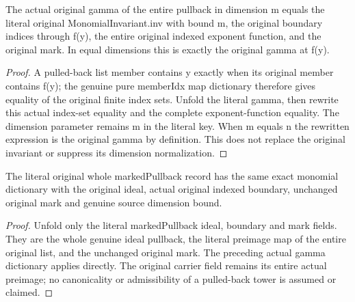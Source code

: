\begin{theorem}\label{hir:submersion-actual-monomial-value-dictionary}
\leanok
The actual original gamma of the entire pullback in dimension m equals the literal original MonomialInvariant.inv with bound m, the original boundary indices through f(y), the entire original indexed exponent function, and the original mark. In equal dimensions this is exactly the original gamma at f(y).
\end{theorem}
\begin{proof}
A pulled-back list member contains y exactly when its original member contains f(y); the genuine pure memberIdx map dictionary therefore gives equality of the original finite index sets. Unfold the literal gamma, then rewrite this actual index-set equality and the complete exponent-function equality. The dimension parameter remains m in the literal key. When m equals n the rewritten expression is the original gamma by definition. This does not replace the original invariant or suppress its dimension normalization.
\end{proof}

\begin{theorem}\label{hir:submersion-literal-marked-monomial-value-dictionary}
\leanok
The literal original whole markedPullback record has the same exact monomial dictionary with the original ideal, actual original indexed boundary, unchanged original mark and genuine source dimension bound.
\end{theorem}
\begin{proof}
Unfold only the literal markedPullback ideal, boundary and mark fields. They are the whole genuine ideal pullback, the literal preimage map of the entire original list, and the unchanged original mark. The preceding actual gamma dictionary applies directly. The original carrier field remains its entire actual preimage; no canonicality or admissibility of a pulled-back tower is assumed or claimed.
\end{proof}

